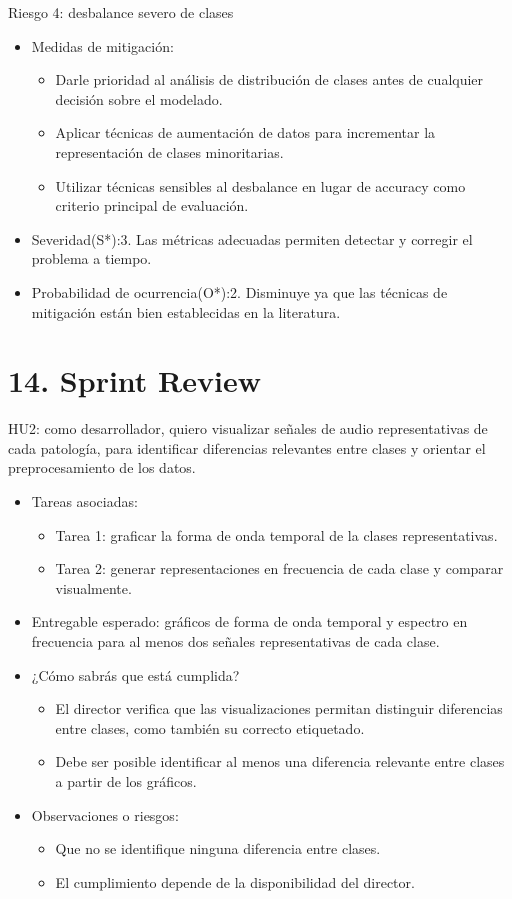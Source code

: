 \documentclass[
11pt, %
]{charter}
\begin{document}
Riesgo 4: desbalance severo de clases
\begin{itemize}
  \item Medidas de mitigación:
    \begin{itemize}
      \item Darle prioridad al análisis de distribución de clases antes de cualquier decisión sobre el modelado.
      \item Aplicar técnicas de aumentación de datos para incrementar la representación de clases minoritarias.
      \item Utilizar técnicas sensibles al desbalance en lugar de accuracy como criterio principal de evaluación.
    \end{itemize}
  \item Severidad(S*):3. Las métricas adecuadas permiten detectar y corregir el problema a tiempo.
  \item Probabilidad de ocurrencia(O*):2. Disminuye ya que las técnicas de mitigación están bien establecidas en la literatura.
\end{itemize}

\newpage

\section{14. Sprint Review}
\label{sec:sprint_review}
HU2: como desarrollador, quiero visualizar señales de audio representativas de cada patología, para identificar diferencias relevantes 
entre clases y orientar el preprocesamiento de los datos.
\begin{itemize}
  \item Tareas asociadas:
    \begin{itemize}
      \item Tarea 1: graficar la forma de onda temporal de la clases representativas.
      \item Tarea 2: generar representaciones en frecuencia de cada clase y comparar visualmente.
    \end{itemize}
  \item Entregable esperado: gráficos de forma de onda temporal y espectro en frecuencia para al menos dos señales representativas de cada clase.
  \item ¿Cómo sabrás que está cumplida?
    \begin{itemize}
      \item El director verifica que las visualizaciones permitan distinguir diferencias entre clases, como también su correcto etiquetado.
      \item Debe ser posible identificar al menos una diferencia relevante entre clases a partir de los gráficos.
    \end{itemize}
  \item Observaciones o riesgos:
    \begin{itemize}
      \item Que no se identifique ninguna diferencia entre clases.
      \item El cumplimiento depende de la disponibilidad del director.
    \end{itemize}
\end{itemize}
\end{document}

